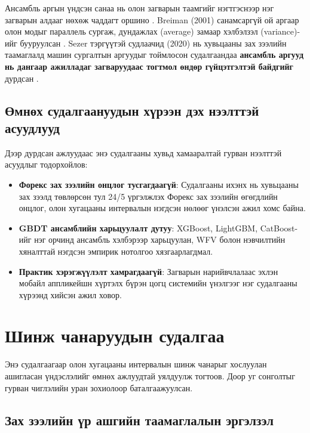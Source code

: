 Ансамбль аргын үндсэн санаа нь олон загварын таамгийг нэгтгэснээр нэг загварын алдааг нөхөж чаддагт оршино \cite{dietterich2000ensemble}. Breiman (2001) санамсаргүй ой аргаар олон модыг параллель сургаж, дундажлах (average) замаар хэлбэлзэл (variance)-ийг бууруулсан \cite{breiman2001random}. Sezer тэргүүтэй судлаачид (2020) нь хувьцааны зах зээлийн таамаглалд машин сургалтын аргуудыг тоймлосон судалгаандаа \textbf{ансамбль аргууд нь дангаар ажилладаг загваруудаас тогтмол өндөр гүйцэтгэлтэй байдгийг} дурдсан \cite{sezer2020financial}.

\subsection{Өмнөх судалгаануудын хүрээн дэх нээлттэй асуудлууд}
Дээр дурдсан ажлуудаас энэ судалгааны хувьд хамааралтай гурван нээлттэй асуудлыг тодорхойлов:
\begin{itemize}
    \item \textbf{Форекс зах зээлийн онцлог тусгагдаагүй}: Судалгааны ихэнх нь хувьцааны зах зээлд төвлөрсөн тул 24/5 үргэлжлэх Форекс зах зээлийн өгөгдлийн онцлог, олон хугацааны интервалын нэгдсэн нөлөөг үнэлсэн ажил хомс байна.
    \item \textbf{GBDT ансамблийн харьцуулалт дутуу}: XGBoost, LightGBM, CatBoost-ийг нэг орчинд ансамбль хэлбэрээр харьцуулан, WFV болон нэвчилтийн хяналттай нэгдсэн эмпирик нотолгоо хязгаарлагдмал.
    \item \textbf{Практик хэрэгжүүлэлт хамрагдаагүй}: Загварын нарийвчлалаас эхлэн мобайл аппликейшн хүртэлх бүрэн цогц системийн үнэлгээг нэг судалгааны хүрээнд хийсэн ажил ховор.
\end{itemize}

\section{Шинж чанаруудын судалгаа}

Энэ судалгаагаар олон хугацааны интервалын шинж чанарыг хослуулан ашигласан үндэслэлийг өмнөх ажлуудтай уялдуулж тогтоов. Доор уг сонголтыг гурван чиглэлийн уран зохиолоор баталгаажуулсан.

\subsection{Зах зээлийн үр ашгийн таамаглалын эргэлзэл}

